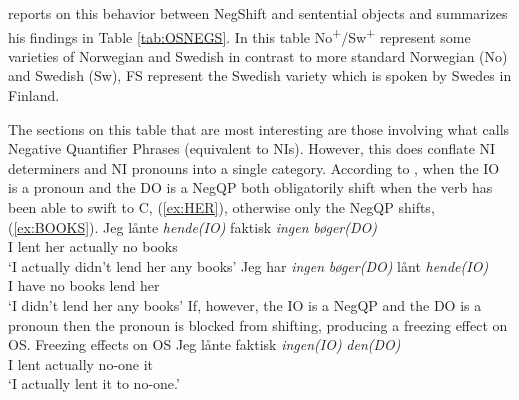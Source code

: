 \documentclass[12pt, letterpaper]{article}
\begin{document}
\citet{christensenInterfacesNegationSyntax2005} reports on this behavior between NegShift and sentential objects and summarizes his findings in Table \ref{tab:OSNEGS}. In this table No\textsuperscript{+}/Sw\textsuperscript{+} represent some varieties of Norwegian and Swedish in contrast to more standard Norwegian (No) and Swedish (Sw), FS represent the Swedish variety which is spoken by Swedes in Finland.

The sections on this table that are most interesting are those involving what \citeauthor{christensenInterfacesNegationSyntax2005} calls Negative Quantifier Phrases (equivalent to NIs). However, this does conflate NI determiners and NI pronouns into a single category. According to \citeauthor{christensenInterfacesNegationSyntax2005}, when the IO is a pronoun and the DO is a NegQP both obligatorily shift when the verb has been able to swift to C, (\ref{ex:HER}), otherwise only the NegQP shifts, (\ref{ex:BOOKS}).
	\ea 
		\ea \label{ex:HER}
		\gll Jeg lånte \textit{hende(IO)} faktisk \textit{ingen} \textit{bøger(DO)}\\
		I lent her actually no books\\
		\glt `I actually didn't lend her any books'
		\ex \label{ex:BOOKS}
		\gll Jeg har \textit{ingen} \textit{bøger(DO)} lånt \textit{hende(IO)}\\
		I have no books lend her\\
		\glt `I didn't lend her any books'
		\z 
	\z 
If, however, the IO is a NegQP and the DO is a pronoun then the pronoun is blocked from shifting, producing a freezing effect on OS. 
	\ea Freezing effects on OS
		\ea 
		\gll Jeg lånte faktisk \textit{ingen(IO)} \textit{den(DO)}\\
		I lent actually no-one it\\
		\glt `I actually lent it to no-one.'
		\z 
	\z
\end{document}
